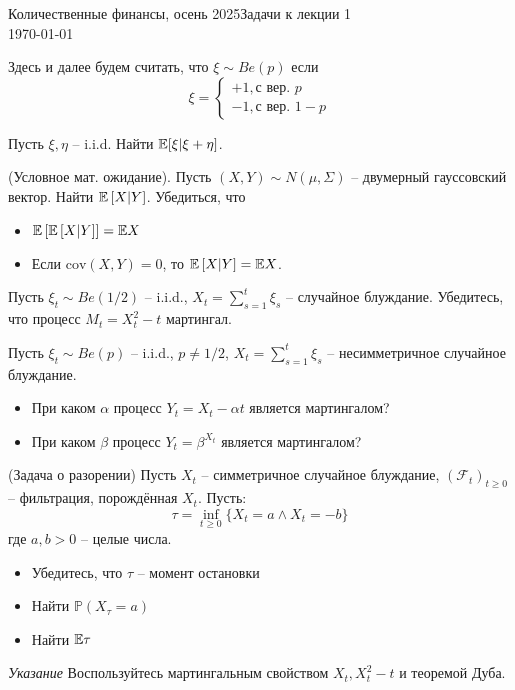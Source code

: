 \documentclass[12pt]{article}
\begin{document}
\noindent Количественные финансы, осень 2025\hfill Задачи к лекции 1\\
\today

\hrulefill

Здесь и далее будем считать, что $\xi \sim Be(p)$ если
$$
    \xi = \begin{cases}
        +1, \text{с вер. } p\\
        -1, \text{с вер. } 1-p
    \end{cases}
$$

\begin{problem}
    Пусть $\xi, \eta$ -- i.i.d. Найти
    $\mathbb{E} [\xi | \xi + \eta]$. 
\end{problem}
\begin{problem}
(Условное мат. ожидание). Пусть $(X, Y) \sim N(\mu, \Sigma)$ -- двумерный гауссовский вектор. Найти $\mathbb{E}\left[ X | Y\right]$. Убедиться, что 
\begin{itemize}
    \item $\mathbb{E}\left[\mathbb{E}\left[ X | Y\right]\right] = \mathbb{E} X$
    \item Если $\mathrm{cov}(X, Y)=0$, то $\mathbb{E}\left[ X | Y\right] = \mathbb{E} X$.
\end{itemize}
\end{problem}

\begin{problem}
    Пусть $\xi_t \sim Be(1/2)$ -- i.i.d., $X_t = \sum_{s=1}^t \xi_s$ -- случайное блуждание. Убедитесь, что процесс $M_t = X_t^2 - t$ мартингал.
\end{problem}

\begin{problem}
    Пусть $\xi_t \sim Be(p)$ -- i.i.d., $p\neq 1/2$, $X_t = \sum_{s=1}^t \xi_s$ -- несимметричное случайное блуждание.

    \begin{itemize}
        \item При каком $\alpha$ процесс $Y_t = X_t - \alpha t$ является мартингалом?
        \item При каком $\beta$ процесс $Y_t = \beta^{X_t}$ является мартингалом?
    \end{itemize}
\end{problem}

\begin{problem}(Задача о разорении)
    Пусть $X_t$ -- симметричное случайное блуждание, $(\mathcal{F}_t)_{t\geq0}$ -- фильтрация, порождённая $X_t$. Пусть:
    $$
        \tau = \inf_{t \geq 0} \{ X_t = a \wedge X_t =-b\}
    $$где $a, b > 0$ -- целые числа.

    \begin{itemize}
        \item Убедитесь, что $\tau$ -- момент остановки
        \item Найти $\mathbb{P}(X_{\tau} = a)$
        \item Найти $\mathbb{E} \tau$
    \end{itemize}
    \textit{Указание} Воспользуйтесь мартингальным свойством $X_t, X_t^2-t$ и теоремой Дуба.
\end{problem}
\end{document}
